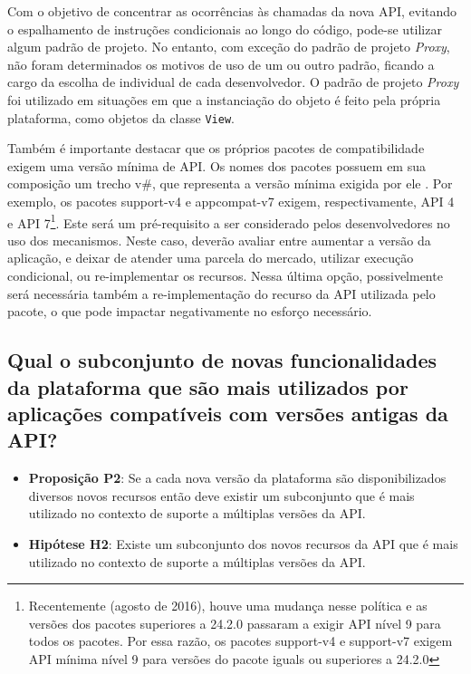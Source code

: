 Com o objetivo de concentrar as ocorrências às chamadas da nova API, evitando o
espalhamento de instruções condicionais ao longo do código, pode-se utilizar algum
padrão de projeto. No entanto, com exceção do padrão de projeto \textit{Proxy},
não foram determinados os motivos de uso de um ou outro padrão, ficando a cargo da
escolha de individual de cada desenvolvedor. O padrão de projeto \textit{Proxy} foi
utilizado em situações em que a instanciação do objeto é feito pela própria plataforma,
como objetos da classe \texttt{View}.

Também é importante destacar que os próprios pacotes de compatibilidade exigem uma
versão mínima de API. Os nomes dos pacotes possuem em sua composição um trecho v\#,
que representa a versão mínima exigida por ele \cite{SupportLibrary2017}. 
Por exemplo, os pacotes support-v4 e appcompat-v7 exigem, respectivamente, API 4 e
API 7\footnote{Recentemente (agosto de 2016), houve uma mudança nesse política e
as versões dos pacotes superiores a 24.2.0 passaram a exigir API nível 9 para todos
os pacotes. Por essa razão, os pacotes support-v4 e support-v7 exigem API mínima nível
9 para versões do pacote iguals ou superiores a 24.2.0}. Este será um pré-requisito a
ser considerado pelos desenvolvedores no uso dos mecanismos. Neste caso, deverão avaliar
entre aumentar a versão da aplicação, e deixar de atender uma parcela do mercado, utilizar
execução condicional, ou re-implementar os recursos. Nessa última opção, possivelmente será
necessária também a re-implementação do recurso da API utilizada pelo pacote, o que pode
impactar negativamente no esforço necessário.   

\subsection{Qual o subconjunto de novas funcionalidades da plataforma que são mais
utilizados por aplicações compatíveis com versões antigas da API?} \label{subsec:mudancas}

\begin{itemize}
	\item \textbf{Proposição P2}: Se a cada nova versão da plataforma são disponibilizados
	diversos novos recursos então deve existir um subconjunto que é mais utilizado no 
	contexto de suporte a múltiplas versões da API.
	\item \textbf{Hipótese H2}: Existe um subconjunto dos novos recursos da API que é
	mais utilizado no contexto de suporte a múltiplas versões da API.
\end{itemize}

